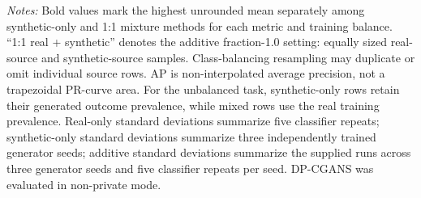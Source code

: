 \begin{table}[htbp]
    \vspace{2mm}
    \begin{minipage}{0.96\linewidth}
        \footnotesize
        \textit{Notes:} Bold values mark the highest unrounded mean separately
        among synthetic-only and 1:1 mixture methods for each metric and
        training balance. ``1:1 real + synthetic'' denotes the additive
        fraction-1.0 setting: equally sized real-source and synthetic-source
        samples. Class-balancing resampling may duplicate or omit individual
        source rows. AP is non-interpolated average precision, not a
        trapezoidal PR-curve area. For the unbalanced task, synthetic-only rows retain
        their generated outcome prevalence, while mixed rows use the real
        training prevalence. Real-only standard deviations summarize five
        classifier repeats; synthetic-only standard deviations summarize three
        independently trained generator seeds; additive standard deviations
        summarize the supplied runs across three generator seeds and five
        classifier repeats per seed. DP-CGANS was evaluated in non-private
        mode.
    \end{minipage}
\end{table}
